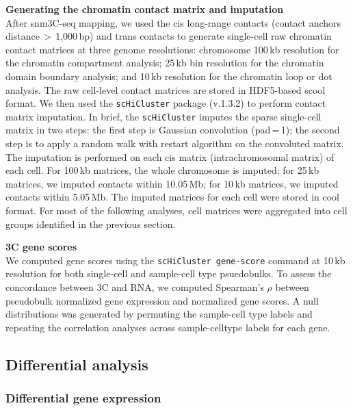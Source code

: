 \noindent
\textbf{Generating the chromatin contact matrix and imputation} \\
After snm3C-seq mapping, we used the cis long-range contacts (contact anchors distance\,$>$\,1{,}000\,bp) and trans contacts to generate single-cell raw chromatin contact matrices at three genome resolutions: chromosome 100\,kb resolution for the chromatin compartment analysis; 25\,kb bin resolution for the chromatin domain boundary analysis; and 10\,kb resolution for the chromatin loop or dot analysis. The raw cell-level contact matrices are stored in HDF5-based scool format. We then used the \texttt{scHiCluster} \cite{Zhou2019-vd} package (v.1.3.2) to perform contact matrix imputation. In brief, the \texttt{scHiCluster} imputes the sparse single-cell matrix in two steps: the first step is Gaussian convolution (pad\,=\,1); the second step is to apply a random walk with restart algorithm on the convoluted matrix. The imputation is performed on each cis matrix (intrachromosomal matrix) of each cell. For 100\,kb matrices, the whole chromosome is imputed; for 25\,kb matrices, we imputed contacts within 10.05\,Mb; for 10\,kb matrices, we imputed contacts within 5.05\,Mb. The imputed matrices for each cell were stored in cool format. For most of the following analyses, cell matrices were aggregated into cell groups identified in the previous section.

\noindent
\textbf{3C gene scores} \\
We computed gene scores using the \texttt{scHiCluster gene-score} command at 10\,kb resolution for both single-cell and sample-cell type psuedobulks. To assess the concordance between 3C and RNA, we computed Spearman’s $\rho$ between pseudobulk normalized gene expression and normalized gene scores. A null distributions was generated by permuting the sample-cell type labels and repeating the correlation analyses across sample-celltype labels for each gene.

\subsection{Differential analysis}

\subsubsection{Differential gene expression}

